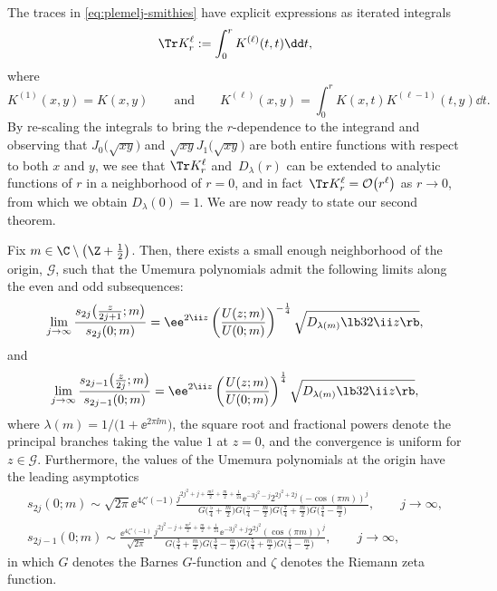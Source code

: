 The traces in \eqref{eq:plemelj-smithies} have explicit expressions as iterated integrals
\[
\Tr K_r^\ell := \int_0^r K^{(\ell)}(t, t) \dd t,
\]
where
\[
K^{(1)}(x, y) = K(x, y) \qquad \text{and} \qquad K^{(\ell)}(x, y) = \int_0^r K(x, t) K^{(\ell - 1)}(t, y) \dd t.
\]
By re-scaling the integrals to bring the $r$-dependence to the integrand and observing that $J_0 \big( \sqrt{xy} \big)$ and $\sqrt{xy}J_1\big(\sqrt{xy}\big)$ are both entire functions with respect to both $x$ and $y$, we see that $\Tr K_r^{\ell}$ and~$D_\lambda ( r)$ can be extended to analytic functions of $r$ in a neighborhood of $r=0$, and in fact~$\Tr K_r^{\ell}=\mathcal{O}\big(r^\ell\big)$ as $r\to 0$, from which we obtain $D_\lambda(0)=1$. We are now ready to state our second theorem.
\begin{Theorem}\label{thm:umemura_asym}
Fix $m \in \C \setminus \big(\Z + \frac{1}{2}\big)$. Then, there exists a small enough neighborhood of the origin, $\mathcal{G}$, such that the Umemura polynomials admit the following limits along the even and odd subsequences:
\begin{equation}
 \lim_{j\to\infty}\frac{s_{2j}\big( \frac{z}{2j+1};m \big)}{s_{2j}(0;m)}=\ee^{2\ii z}\left(\frac{U(z;m)}{U(0;m)}\right)^{-\frac{1}{4}} \sqrt{D_{\lambda(m)}\lb 32\ii z\rb},
\label{eq:umemura-asymtotics-1-bessel}
\end{equation}
and
\begin{equation}
 \lim_{j\to\infty}\frac{s_{2j-1} \big(\frac{z}{2j} ;m\big)}{s_{2j-1}(0;m)}=\ee^{2\ii z}\left(\frac{U(z;m)}{U(0;m)}\right)^{\frac{1}{4}} \sqrt{D_{\lambda(m)}\lb 32\ii z\rb},
\label{eq:umemura-asymtotics-2-bessel}
\end{equation}
where $\lambda(m)=1/\big(1+\ee^{2\pi \ii m}\big)$, the square root and fractional powers denote the principal branches taking the value $1$ at $z=0$, and the convergence is uniform for $z\in\mathcal{G}$. Furthermore,
the values of the Umemura polynomials at the origin have the leading asymptotics
\begin{gather}
 s_{2j}(0;m)\sim\sqrt{2\pi}\ee^{4\zeta'(-1)}\frac{j^{2j^2+j+\frac{m^2}{2}+\frac{m}{2}+\frac{1}{24}}\ee^{-3j^2-j}2^{2j^2+2j}(-\cos(\pi m))^j}{G\big(\frac{5}{4}+\frac{m}{2}\big)G\big(\frac{5}{4}-\frac{m}{2}\big)G\big(\frac{7}{4}+\frac{m}{2}\big)G\big(\frac{3}{4}-\frac{m}{2}\big)},\qquad j\to\infty,\label{eq:umemura-zero-asym-even}
\\
 s_{2j-1}(0;m)\sim\frac{\ee^{4\zeta'(-1)}}{\sqrt{2\pi}}\frac{j^{2j^2-j+\frac{m^2}{2}+\frac{m}{2}+\frac{1}{24}}\ee^{-3j^2+j}2^{2j^2}(\cos(\pi m))^j}{G\big(\frac{3}{4}+\frac{m}{2}\big)G\big(\frac{3}{4}-\frac{m}{2}\big)G\big(\frac{5}{4}+\frac{m}{2}\big)G\big(\frac{1}{4}-\frac{m}{2}\big)},\qquad j\to\infty,\label{eq:umemura-zero-asym-odd}
\end{gather}
in which $G$ denotes the Barnes $G$-function and $\zeta$ denotes the Riemann zeta function.
\end{Theorem}
